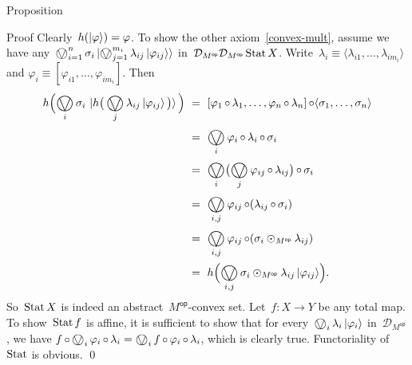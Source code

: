 \documentclass[b]{subfiles}
\begin{document}
\begin{parsec}
\begin{point}{Proposition}
\begin{point}{Proof}
Clearly~$h(\ket{\varphi}) = \varphi$.
To show the other axiom~\eqref{convex-mult},
assume we have any~$\bigovee^n_{i=1} \sigma_i \ket{\bigovee^{m_i}_{j=1} \lambda_{ij} \ket{\varphi_{ij}}}$
in~$\mathcal{D}_{M^\mathsf{op}} \mathcal{D}_{M^{\mathsf{op}}} \operatorname{Stat} X$.
Write~$\lambda_i \equiv \langle\lambda_{i1}, \ldots, \lambda_{im_i}\rangle$
and $\varphi_i \equiv [\varphi_{i1}, \ldots, \varphi_{i{m_i}}]$.
Then
\begin{align*}
    h \Bigl( \bigovee_i \sigma_i \, \ket{
        h\bigl(\, \bigovee_j \lambda_{ij} \ket{\varphi_{ij}}\, \bigr)
    } \, \Bigr)
    &\ = \ 
    [\varphi_1 \after \lambda_1, \ldots, 
    \varphi_n \after \lambda_n] \after \langle
    \sigma_1, \ldots, \sigma_n
    \rangle
    \\ & \ = \ 
    \bigovee_{i} \varphi_i \after \lambda_i \after \sigma_i
    \\ & \ = \ 
    \bigovee_{i} \bigl(\bigovee_j \varphi_{ij} \after \lambda_{ij}\bigr) \after \sigma_i
    \\ & \ = \ 
    \bigovee_{i,j} \varphi_{ij} \after (\lambda_{ij} \after \sigma_i)
    \\ & \ = \ 
    \bigovee_{i,j} \varphi_{ij} \after (\sigma_i \odot_{M^{\mathsf{op}}} \lambda_{ij})
    \\ & \ = \ 
    h \Bigl( \bigovee_{i,j} \sigma_i \odot_{M^{\mathsf{op}}} \lambda_{ij} \ket{\varphi_{ij}} \Bigr).
\end{align*}
So~$\operatorname{Stat} X$ is indeed an abstract~$M^{\mathsf{op}}$-convex set.
Let~$f\colon X \to Y$ be any total map.
To show~$\operatorname{Stat} f$ is affine,
it is sufficient to show that
for every~$\bigovee_i \lambda_i \ket{\varphi_i}$
 in~$\mathcal{D}_{M^{\mathsf{op}}}$,
 we have
        $f \after \bigovee_i  \varphi_i \after \lambda_i 
         = 
        \bigovee_i f \after  \varphi_i \after \lambda_i$,
        which is clearly true.
    Functoriality of~$\operatorname{Stat}$ is obvious. \qed
\end{point}
\end{point}
\end{parsec}
\end{document}
